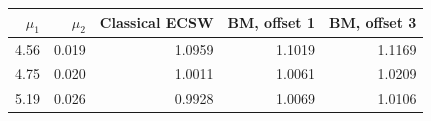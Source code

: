 \begin{tabular}{@{}rrrrr@{}}
\toprule
$\mu_1$ & $\mu_2$ & Classical ECSW & BM, offset 1 & BM, offset 3\\
\midrule
4.56 & 0.019 & 1.0959 & 1.1019 & 1.1169\\
4.75 & 0.020 & 1.0011 & 1.0061 & 1.0209\\
5.19 & 0.026 & 0.9928 & 1.0069 & 1.0106\\
\bottomrule
\end{tabular}
